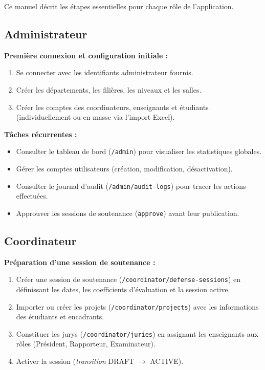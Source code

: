 Ce manuel décrit les étapes essentielles pour chaque rôle de l'application.

\subsection{Administrateur}

\textbf{Première connexion et configuration initiale :}
\begin{enumerate}
    \item Se connecter avec les identifiants administrateur fournis.
    \item Créer les départements, les filières, les niveaux et les salles.
    \item Créer les comptes des coordinateurs, enseignants et étudiants (individuellement ou en masse via l'import Excel).
\end{enumerate}

\textbf{Tâches récurrentes :}
\begin{itemize}
    \item Consulter le tableau de bord (\texttt{/admin}) pour visualiser les statistiques globales.
    \item Gérer les comptes utilisateurs (création, modification, désactivation).
    \item Consulter le journal d'audit (\texttt{/admin/audit-logs}) pour tracer les actions effectuées.
    \item Approuver les sessions de soutenance (\texttt{approve}) avant leur publication.
\end{itemize}

\subsection{Coordinateur}

\textbf{Préparation d'une session de soutenance :}
\begin{enumerate}
    \item Créer une session de soutenance (\texttt{/coordinator/defense-sessions}) en définissant les dates, les coefficients d'évaluation et la session active.
    \item Importer ou créer les projets (\texttt{/coordinator/projects}) avec les informations des étudiants et encadrants.
    \item Constituer les jurys (\texttt{/coordinator/juries}) en assignant les enseignants aux rôles (Président, Rapporteur, Examinateur).
    \item Activer la session (\textit{transition} DRAFT $\rightarrow$ ACTIVE).
\end{enumerate}

